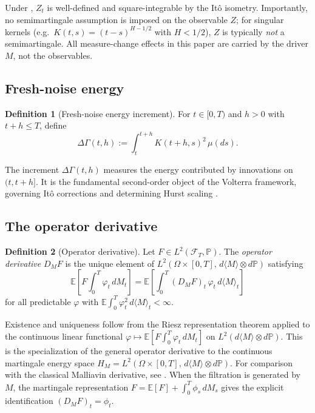 \documentclass[11pt]{article}
\theoremstyle{plain}
\theoremstyle{definition}
\newtheorem{definition}{Definition}[section]
\theoremstyle{remark}
\newcommand{\E}{\mathbb{E}}
\newcommand{\F}{\mathcal{F}}
\newcommand{\PP}{\mathbb{P}}
\newcommand{\dGamma}{\Delta\Gamma}
\newcommand{\bracket}[1]{\langle #1 \rangle}
\begin{document}
Under , $Z_t$ is well-defined and square-integrable by the
It\^o isometry. Importantly, no semimartingale assumption is imposed on the
observable $Z$; for singular kernels (e.g.\ $K(t,s) = (t-s)^{H-1/2}$ with
$H < 1/2$), $Z$ is typically \emph{not} a semimartingale. All
measure-change effects in this paper are carried by the driver $M$, not
the observables.

\subsection{Fresh-noise energy}

\begin{definition}[Fresh-noise energy increment]\label{def:DeltaGamma}
For $t \in [0,T)$ and $h > 0$ with $t + h \le T$, define
\[
\dGamma(t,h) := \int_t^{t+h} K(t+h,s)^2\,\mu(ds).
\]
\end{definition}

The increment $\dGamma(t,h)$ measures the energy contributed by innovations
on $(t, t+h]$. It is the fundamental second-order object of the Volterra
framework, governing It\^o corrections and determining Hurst scaling
\cite{Fontes2026f}.

\subsection{The operator derivative}

\begin{definition}[Operator derivative]\label{def:DM}
Let $F \in L^2(\F_T, \PP)$. The \emph{operator derivative} $D_M F$ is the
unique element of $L^2(\Omega \times [0,T],\, d\bracket{M} \otimes d\PP)$ satisfying
\begin{equation}\label{eq:DM-riesz}
\E\!\left[F \int_0^T \varphi_t\,dM_t\right]
= \E\!\left[\int_0^T (D_M F)_t\,\varphi_t\,d\bracket{M}_t\right]
\end{equation}
for all predictable $\varphi$ with $\E\int_0^T \varphi_t^2\,d\bracket{M}_t < \infty$.
\end{definition}

Existence and uniqueness follow from the Riesz representation theorem applied
to the continuous linear functional
$\varphi \mapsto \E[F \int_0^T \varphi_t\,dM_t]$ on $L^2(d\bracket{M} \otimes d\PP)$.
This is the specialization of the general operator derivative \cite{Fontes2026d}
to the continuous martingale energy space $H_M = L^2(\Omega \times [0,T],\, d\bracket{M} \otimes d\PP)$.
For comparison with the classical Malliavin derivative, see \cite{Nualart2006}.
When the filtration is generated by $M$, the martingale representation
$F = \E[F] + \int_0^T \phi_s\,dM_s$ gives the explicit identification
$(D_M F)_t = \phi_t$.
\end{document}
